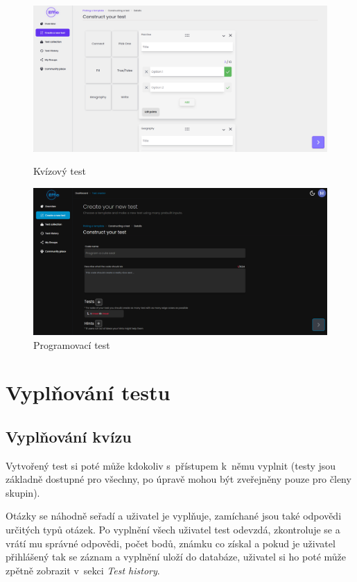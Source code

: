 \documentclass[12pt, a4paper,
openright
]{report}
\begin{document}
\begin{figure}[h]
	\centering
	\begin{minipage}[]{0.49\textwidth}
		\includegraphics[width=\textwidth]{image/test-creator1.png}
		\caption{Kvízový test}
		\label{fig:test-creator1}
	\end{minipage}
	\hfill
	\begin{minipage}[]{0.49\textwidth}
		\includegraphics[width=\textwidth]{image/test-creator2.png}
		\caption{Programovací test}
		\label{fig:test-creator2}
	\end{minipage}
\end{figure}

\section{Vyplňování testu}
\label{sec:test-take}
\subsection{Vyplňování kvízu}
Vytvořený test si poté může kdokoliv s~přístupem k~němu vyplnit (testy jsou základně dostupné pro všechny, po úpravě mohou být zveřejněny pouze pro členy skupin).

Otázky se náhodně seřadí a uživatel je vyplňuje, zamíchané jsou také odpovědi určitých typů otázek. Po vyplnění všech uživatel test odevzdá, zkontroluje se a vrátí mu správné odpovědi, počet bodů, známku co získal a pokud je uživatel přihlášený tak se záznam a vyplnění uloží do databáze, uživatel si ho poté může zpětně zobrazit v~sekci \textit{Test history}.
\end{document}
